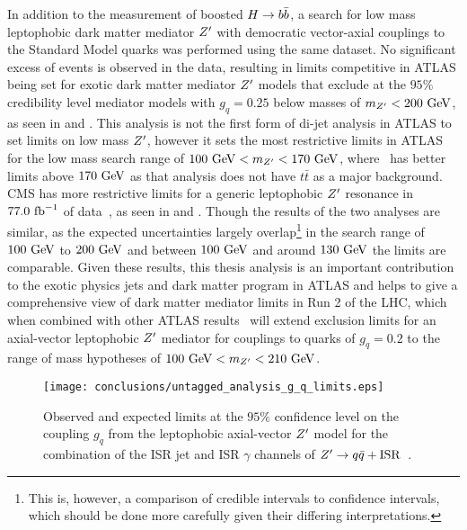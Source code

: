 In addition to the measurement of boosted $H \to b\bar{b}$, a search for low mass leptophobic dark matter mediator $\Zprime$ with democratic vector-axial couplings to the Standard Model quarks was performed using the same dataset.
No significant excess of events is observed in the data, resulting in limits competitive in ATLAS being set for exotic dark matter mediator $\Zprime$ models that exclude at the $95\%$ credibility level mediator models with $g_{q} = 0.25$ below masses of $m_{Z^{\prime}} < 200~\mathrm{GeV}$, as seen in  and .
This analysis is not the first form of di-jet analysis in ATLAS to set limits on low mass $\Zprime$, however it sets the most restrictive limits in ATLAS for the low mass search range of $100~\mathrm{GeV} < m_{Z^{\prime}} <170~\mathrm{GeV}$, where~\cite{EXOT-2017-01} has better limits above $170~\mathrm{GeV}$ as that analysis does not have $t\bar{t}$ as a major background.
CMS has more restrictive limits for a generic leptophobic $\Zprime$ resonance in $77.0~\mathrm{fb}^{-1}$ of data~\cite{CMS:2019hlx}, as seen in  and .
Though the results of the two analyses are similar, as the expected uncertainties largely overlap\footnote{%
 This is, however, a comparison of credible intervals to confidence intervals, which should be done more carefully given their differing interpretations.}
in the search range of $100~\mathrm{GeV}$ to $200~\mathrm{GeV}$ and between $100~\mathrm{GeV}$ and around $130~\mathrm{GeV}$ the limits are comparable.
Given these results, this thesis analysis is an important contribution to the exotic physics jets and dark matter program in ATLAS and helps to give a comprehensive view of dark matter mediator limits in Run 2 of the LHC, which when combined with other ATLAS results~\cite{EXOT-2017-32} will extend exclusion limits for an axial-vector leptophobic $\Zprime$ mediator for couplings to quarks of $g_{q} = 0.2$ to the range of mass hypotheses of $100~\mathrm{GeV} < m_{Z^{\prime}} < 210~\mathrm{GeV}$.

\begin{figure}[htbp]
 \centering
 \texttt{[image: conclusions/untagged\_analysis\_g\_q\_limits.eps]}
 \caption[Observed and expected limits at the $95\%$ confidence level on the coupling $g_{q}$ from the leptophobic axial-vector $\Zprime$ model for the combination of the ISR jet and ISR $\gamma$ channels of $\Zprime \to q\bar{q}+\mathrm{ISR}$.]{%
  Observed and expected limits at the $95\%$ confidence level on the coupling $g_{q}$ from the leptophobic axial-vector $\Zprime$ model for the combination of the ISR jet and ISR $\gamma$ channels of $\Zprime \to q\bar{q}+\mathrm{ISR}$~\cite{EXOT-2017-01}.
 }
 \label{fig:untagged_analysis_g_q_limits}
\end{figure}

